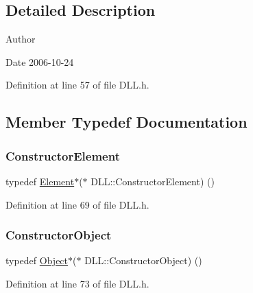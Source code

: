 \subsection{Detailed Description}
\begin{DoxyAuthor}{Author}

\end{DoxyAuthor}
\begin{DoxyDate}{Date}
2006-\/10-\/24 
\end{DoxyDate}


Definition at line 57 of file D\+L\+L.\+h.



\subsection{Member Typedef Documentation}
\mbox{\label{classDLL_a104a81e667f9a54504c0faf095f77fc7}} 
\subsubsection{\texorpdfstring{Constructor\+Element}{ConstructorElement}}
{\footnotesize\ttfamily typedef \hyperlink{classElement}{Element}$\ast$($\ast$ D\+L\+L\+::\+Constructor\+Element) ()}



Definition at line 69 of file D\+L\+L.\+h.

\mbox{\label{classDLL_a67b9601085a9f972b9ac6876cd11398e}} 
\subsubsection{\texorpdfstring{Constructor\+Object}{ConstructorObject}}
{\footnotesize\ttfamily typedef \hyperlink{classObject}{Object}$\ast$($\ast$ D\+L\+L\+::\+Constructor\+Object) ()}



Definition at line 73 of file D\+L\+L.\+h.

\mbox{\label{classDLL_afbf4c85f3517962642944b80833a3607}} 
